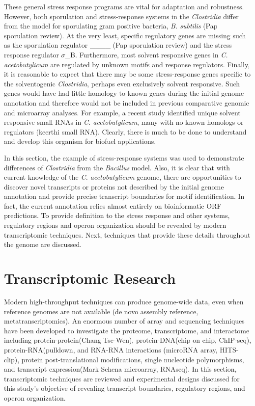 These general stress response programs are vital for adaptation and robustness. However, both sporulation and stress-response systems in the \textit{Clostridia} differ from the model for sporulating gram positive bacteria, \textit{B. subtilis} (Pap sporulation review). At the very least, specific regulatory genes are missing such as the sporulation regulator ____ (Pap sporulation review) and the stress response regulator $\sigma$_B. Furthermore, most solvent responsive genes in \textit{C. acetobutylicum} are regulated by unknown motifs and response regulators. Finally, it is reasonable to expect that there may be some stress-response genes specific to the solventogenic \textit{Clostridia}, perhaps even exclusively solvent responsive. Such genes would have had little homology to known genes during the initial genome annotation and therefore would not be included in previous comparative genomic and microarray analyses. For example, a recent study identified unique solvent responsive small RNAs in \textit{C. acetobutylicum}, many with no known homologs or regulators (keerthi small RNA). Clearly, there is much to be done to understand and develop this organism for biofuel applications.

In this section, the example of stress-response systems was used to demonstrate differences of \textit{Clostridia} from the \textit{Bacillus} model. Also, it is clear that with current knowledge of the \textit{C. acetobutylicum} genome, there are opportunities to discover novel transcripts or proteins not described by the initial genome annotation and provide precise transcript boundaries for motif identification. In fact, the current annotation relies almost entirely on bioinformatic ORF predictions. To provide definition to the stress response and other systems, regulatory regions and operon organization should be revealed by modern transcriptomic techniques. Next, techniques that provide these details throughout the genome are discussed.

\section{Transcriptomic Research}
Modern high-throughput techniques can produce genome-wide data, even when reference genomes are not available (de novo assembly reference, metatranscriptomics). An enormous number of array and sequencing techniques have been developed to investigate the proteome, transcriptome, and interactome including protein-protein(Chang Tse-Wen), protein-DNA(chip on chip, ChIP-seq), protein-RNA(pulldown, and RNA-RNA interactions (microRNA array, HITS-clip), protein post-translational modifications, single nucleotide polymorphisms, and transcript expression(Mark Schena microarray, RNAseq). In this section, transcriptomic techniques are reviewed and experimental designs discussed for this study's objective of revealing transcript boundaries, regulatory regions, and operon organization.

